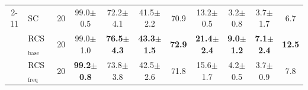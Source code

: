 \begin{table}[ht]
{\begin{tabular}{cll|cccc|cccc}
    \cmidrule(lr){2-11}
    &
    SC & 20  
    & 99.0$\pm$0.5&	72.2$\pm$4.1&	41.5$\pm$2.2 & 70.9
    & 13.2$\pm$0.5&	3.2$\pm$0.8	&3.7$\pm$1.7 & 6.7
    \\
    &
    \cellcolor{green!15}RCS$_\text{base}$ & 20\cellcolor{green!15}
    & \cellcolor{green!15}99.0$\pm$1.0	&\cellcolor{green!15}\textbf{76.5$\pm$4.3}	&\cellcolor{green!15}\textbf{43.3$\pm$1.5} & \cellcolor{green!15}\textbf{72.9}
    & \cellcolor{green!15}\textbf{21.4$\pm$2.4}&\cellcolor{green!15}	\textbf{9.0$\pm$1.2}&\cellcolor{green!15}	\textbf{7.1$\pm$2.4}&\cellcolor{green!15}\textbf{12.5}
    \\
    &
    \cellcolor{green!15}RCS$_\text{freq}$ & 20\cellcolor{green!15}
    & \cellcolor{green!15}\textbf{99.2$\pm$0.8}	&\cellcolor{green!15}73.8$\pm$3.8&\cellcolor{green!15}	42.5$\pm$2.6 & \cellcolor{green!15}71.8
    & \cellcolor{green!15}15.6$\pm$1.7	&\cellcolor{green!15}4.2$\pm$0.5&\cellcolor{green!15}	3.7$\pm$0.9 & \cellcolor{green!15}7.8
    \\

    \bottomrule
  \end{tabular}}
\end{table}
